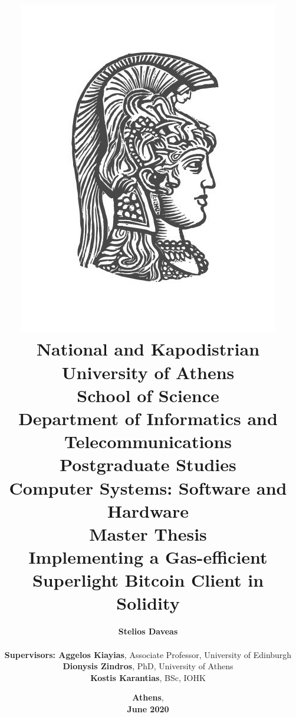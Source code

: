 \title{
    {\includegraphics[scale=0.8]{figures/logo_uoa.jpg}}\\
    {\Large \textbf{National and Kapodistrian University of Athens \\
    School of Science}} \\
    {\large \textbf{Department of Informatics and Telecommunications}}\\
    \vspace{1cm}
    {\large \textbf{Postgraduate Studies}} \\
    {\large \textbf{Computer Systems: Software and Hardware}}\\
    \vspace{5mm}
    {\Large \textbf{Master Thesis}}\\
    \vspace{3mm}
    {\textbf{\LARGE Implementing a Gas-efficient\\Superlight Bitcoin Client in Solidity}}
    }

\author{

    \hspace{-1.5cm}
    \textbf{Stelios Daveas}\\

    \vspace{0.8cm} \\
    \textbf{Supervisors: Aggelos Kiayias}, Associate Professor, University of Edinburgh\\
    \hspace{-0.60cm}
    \textbf{Dionysis Zindros}, PhD, University of Athens\\
    \hspace{-3.70cm}
    \textbf{Kostis Karantias}, BSc, IOHK
}

\date{\textbf{Athens}, \\ \textbf{June 2020}}
